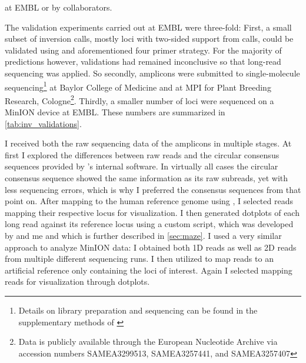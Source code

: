 \begin{table}[ht]
\begin{adjustbox}{inner,minipage=[b]{\textplusmargin}}
\begin{minipage}[t]{0.54\textplusmargin}
{                at EMBL or by collaborators.}
            \end{minipage}
            \hspace{0.04\textplusmargin}
            \begin{minipage}[t]{0.42\textplusmargin}
                \centering
            \end{minipage}
        \end{adjustbox}
\end{table}

The validation experiments carried out at EMBL were three-fold: First, a small
subset of inversion calls, mostly loci with two-sided support from \delly calls,
could be validated using \pcr and aforementioned four primer strategy. For the
majority of predictions however, \pcr validations had remained inconclusive so
that long-read sequencing was applied. So secondly, amplicons were submitted to
\pacbio single-molecule sequencing\footnote{\label{footnote:xbpIhd}Details on
library preparation and sequencing can be found in the supplementary methods of
\citet{Sudmant2015}} at Baylor College of Medicine and at MPI for Plant Breeding
Research, Cologne\footnote{Data is publicly available through the European
Nucleotide Archive via accession numbers SAMEA3299513, SAMEA3257441, and
SAMEA3257407}. Thirdly, a smaller number of loci were sequenced on a
\ont MinION device at EMBL. These numbers are
summarized in \cref{tab:inv_validations}.

I received both the raw sequencing data of the amplicons in multiple stages. At
first I explored the differences between raw \pacbio reads and the circular
consensus sequences provided by \pacbio’s internal software. In virtually all
cases the circular consensus sequence showed the same information as its raw
subreads, yet with less sequencing errors, which is why I preferred the
consensus sequences from that point on. After mapping to the human reference
genome using \blasr, I selected reads mapping their respective locus for
visualization. I then generated dotplots of each long read against its reference
locus using a custom script, which was developed by \markus and me and which is
further described in \cref{sec:maze}. I used a very similar approach to analyze
\ont MinION data: I obtained both 1D reads as well as 2D reads from multiple
different sequencing runs. I then utilized \last to map reads to an artificial
reference only containing the loci of interest. Again I selected mapping reads
for visualization through dotplots.

